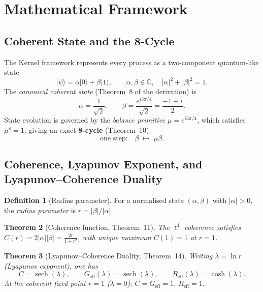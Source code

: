 \documentclass[12pt,a4paper]{article}
\theoremstyle{plain}
\newtheorem{theorem}{Theorem}[section]
\theoremstyle{definition}
\newtheorem{definition}[theorem]{Definition}
\theoremstyle{remark}
\newcommand{\Cx}{\mathbb{C}}
\newcommand{\ket}[1]{\lvert #1 \rangle}
\newcommand{\abs}[1]{\lvert #1 \rvert}
\begin{document}
\section{Mathematical Framework}
\label{sec:framework}

\subsection{Coherent State and the 8-Cycle}

The Kernel framework represents every process as a two-component quantum-like
state
\begin{equation}
  \ket{\psi} = \alpha\ket{0} + \beta\ket{1}, \qquad
  \alpha,\beta \in \Cx,\quad \abs{\alpha}^2+\abs{\beta}^2 = 1.
  \label{eq:state}
\end{equation}
The \emph{canonical coherent state} (Theorem~8 of the derivation) is
\begin{equation}
  \alpha = \frac{1}{\sqrt{2}}, \qquad
  \beta = \frac{e^{i3\pi/4}}{\sqrt{2}} = \frac{-1+i}{2}.
  \label{eq:canonical}
\end{equation}
State evolution is governed by the \emph{balance primitive}
$\mu = e^{i3\pi/4}$, which satisfies $\mu^8 = 1$, giving an exact
\textbf{8-cycle} (Theorem~10):
\begin{equation}
  \text{one step:}\quad \beta \;\mapsto\; \mu\beta.
  \label{eq:mu-step}
\end{equation}

\subsection{Coherence, Lyapunov Exponent, and Lyapunov--Coherence Duality}

\begin{definition}[Radius parameter]
  For a normalised state $(\alpha,\beta)$ with $\abs{\alpha}>0$, the
  \emph{radius parameter} is $r = \abs{\beta}/\abs{\alpha}$.
\end{definition}

\begin{theorem}[Coherence function, Theorem~11]
  \label{thm:coherence}
  The $\ell^1$ coherence satisfies
  $C(r) = 2\abs{\alpha}\abs{\beta} = \tfrac{2r}{1+r^2}$,
  with unique maximum $C(1)=1$ at $r=1$.
\end{theorem}

\begin{theorem}[Lyapunov--Coherence Duality, Theorem~14]
  \label{thm:lyapunov}
  Writing $\lambda = \ln r$ (Lyapunov exponent), one has
  \begin{equation}
    C = \operatorname{sech}(\lambda), \qquad
    G_{\text{eff}}(\lambda) = \operatorname{sech}(\lambda), \qquad
    R_{\text{eff}}(\lambda) = \cosh(\lambda).
    \label{eq:ohm-coherence}
  \end{equation}
  At the coherent fixed point $r=1$ ($\lambda=0$): $C=G_{\text{eff}}=1$,
  $R_{\text{eff}}=1$.
\end{theorem}
\end{document}
